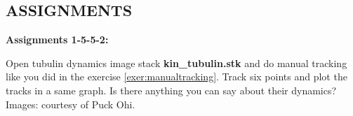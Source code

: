 \subsection{ASSIGNMENTS}

{\sffamily\bfseries
Assignments 1-5-5-2: }

Open tubulin dynamics image stack \textbf{kin\_tubulin.stk} and do manual tracking like you did in the exercise \ref{exer:manualtracking}. Track six
points and plot the tracks in a same graph. Is there anything you can
say about their dynamics?\\ 

Images: courtesy of Puck Ohi.

